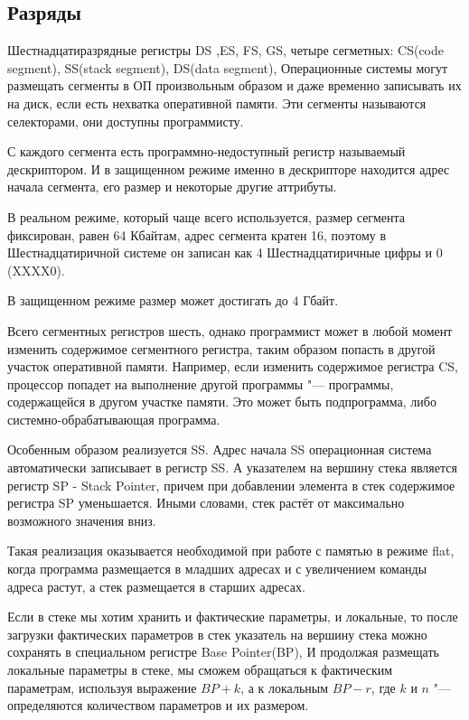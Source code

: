 \subsection{Разряды}

Шестнадцатиразрядные регистры DS ,ES, FS, GS, четыре сегметных: CS(code segment), SS(stack segment), DS(data segment), 
Операционные системы могут размещать сегменты в ОП произвольным образом и даже временно записывать их на диск, если есть
нехватка оперативной памяти. Эти сегменты называются селекторами, они доступны программисту. 

С каждого сегмента есть программно-недоступный регистр называемый дескриптором. И в защищенном режиме именно в дескрипторе находится адрес
начала сегмента, его размер и некоторые другие аттрибуты. 

В реальном режиме, который чаще всего используется, размер
сегмента фиксирован, равен 64 Кбайтам, адрес сегмента кратен 16, поэтому в Шестнадцатиричной системе он записан
как 4 Шестнадцатиричные цифры и 0 (XXXX0).

В защищенном режиме размер может достигать до 4 Гбайт.

Всего сегментных регистров шесть, однако программист может в любой момент изменить содержимое сегментного регистра, таким
образом попасть в другой участок оперативной памяти. Например, если изменить содержимое регистра CS, процессор попадет
на выполнение другой программы "--- программы, содержащейся в другом участке памяти. Это может быть подпрограмма, либо
системно-обрабатывающая программа.

Особенным образом реализуется SS. Адрес начала SS операционная система автоматически записывает в регистр SS. А указателем
на вершину стека является регистр SP - Stack Pointer, причем при добавлении элемента в стек содержимое регистра SP уменьшается.
Иными словами, стек растёт от максимально возможного значения вниз.

Такая реализация оказывается необходимой при работе с памятью в режиме flat, когда программа размещается в младших адресах
и с увеличением команды адреса растут, а стек размещается в старших адресах.

Если в стеке мы хотим хранить и фактические параметры, и локальные, то после загрузки фактических параметров в стек
указатель на вершину стека можно сохранять в специальном регистре Base Pointer(BP), И продолжая размещать локальные
параметры в стеке, мы сможем обращаться к фактическим параметрам, используя выражение $BP + k$, а к локальным $BP - r$,
где $k$ и $n$ "--- определяются количеством параметров и их размером.

